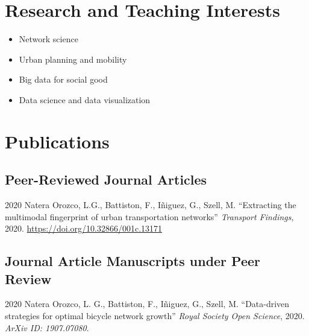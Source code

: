 \documentclass{academiccv}
\begin{document}
\section*{Research and Teaching Interests}
\begin{itemize}
	\item Network science
	\item Urban planning and mobility
	\item Big data for social good
	\item Data science and data visualization
\end{itemize}


\section*{Publications}
\subsection*{Peer-Reviewed Journal Articles}
\begin{tablist}
\item[2020] \tab Natera Orozco, L.G., Battiston, F., I\~niguez, G., Szell, M. \enquote{Extracting the multimodal fingerprint of urban transportation networks} \textit{Transport Findings}, 2020. \url{https://doi.org/10.32866/001c.13171}
\end{tablist}

\subsection*{Journal Article Manuscripts under Peer Review}
\begin{tablist}
	\item[2020] \tab Natera Orozco, L. G., Battiston, F., I\~niguez, G., Szell, M. \enquote{Data-driven strategies for optimal bicycle network growth} \textit{Royal Society Open Science}, 2020. \textit{ArXiv ID: 1907.07080}. 
\end{tablist}

	
\end{document}
